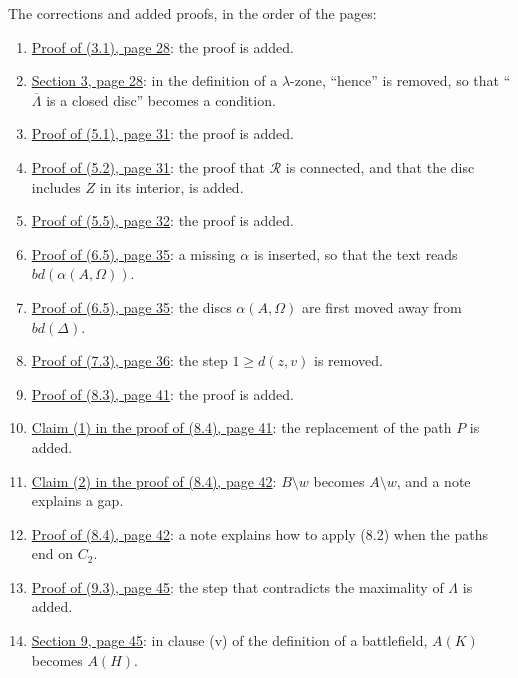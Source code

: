 The corrections and added proofs, in the order of the pages:
\begin{enumerate}\setlength{\itemsep}{1pt}
\item {}\hyperref[fix:3.1-proof-added]{Proof of (3.1), page 28}: the proof is added.
\item {}\hyperref[fix:3-zone]{Section 3, page 28}: in the definition of a $\lambda$-zone,
``hence'' is removed, so that ``$\overline{\Lambda}$ is a closed disc'' becomes a condition.
\item {}\hyperref[fix:5.1-proof-added]{Proof of (5.1), page 31}: the proof is added.
\item {}\hyperref[fix:5.2-proof-added]{Proof of (5.2), page 31}: the proof that $\mathscr{R}$ is
connected, and that the disc includes $Z$ in its interior, is added.
\item {}\hyperref[fix:5.5-proof-added]{Proof of (5.5), page 32}: the proof is added.
\item {}\hyperref[fix:6.5-proof-bd]{Proof of (6.5), page 35}: a missing $\alpha$ is inserted, so
that the text reads $bd(\alpha(A, \Omega))$.
\item {}\hyperref[fix:6.5-proof-discs]{Proof of (6.5), page 35}: the discs $\alpha(A, \Omega)$ are
first moved away from $bd(\Delta)$.
\item {}\hyperref[fix:7.3-proof]{Proof of (7.3), page 36}: the step $1 \ge d(z, v)$ is removed.
\item {}\hyperref[fix:8.3-proof-added]{Proof of (8.3), page 41}: the proof is added.
\item {}\hyperref[fix:8.4-claim1-step-added]{Claim (1) in the proof of (8.4), page 41}: the
replacement of the path $P$ is added.
\item {}\hyperref[fix:8.4-claim2]{Claim (2) in the proof of (8.4), page 42}: $B \setminus w$
becomes $A \setminus w$, and a note explains a gap.
\item {}\hyperref[fix:8.4-proof]{Proof of (8.4), page 42}: a note explains how to apply (8.2)
when the paths end on $C_2$.
\item {}\hyperref[fix:9.3-step-added]{Proof of (9.3), page 45}: the step that contradicts the
maximality of $\Lambda$ is added.
\item {}\hyperref[fix:9-battlefield]{Section 9, page 45}: in clause (v) of the definition of a
battlefield, $A(K)$ becomes $A(H)$.
\end{enumerate}
